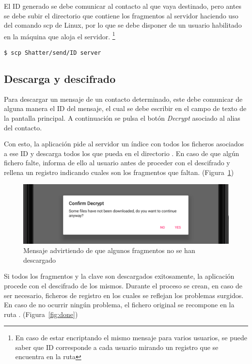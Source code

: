 El ID generado se debe comunicar al contacto al que vaya destinado, pero antes se debe subir el directorio que contiene los fragmentos al servidor haciendo uso del comando scp de Linux, por lo que se debe disponer de un usuario habilitado en la máquina que aloja el servidor. \footnote{En caso de estar encriptando el mismo mensaje para varios usuarios, se puede saber que ID corresponde a cada usuario mirando un registro que se encuentra en la ruta }

\lstset{basicstyle=\ttfamily}
\begin{lstlisting}[language=bash]
  $ scp Shatter/send/ID server
\end{lstlisting}

\subsection{Descarga y descifrado}

Para descargar un mensaje de un contacto determinado, este debe comunicar de alguna manera el ID del mensaje, el cual se debe escribir en el campo de texto de la pantalla principal. A continuación se pulsa el botón \emph{Decrypt} asociado al alias del contacto.

Con esto, la aplicación pide al servidor un índice con todos los ficheros asociados a ese ID y descarga todos los que pueda en el directorio . En caso de que algún fichero falte, informa de ello al usuario antes de proceder con el descifrado y rellena un registro indicando cuales son los fragmentos que faltan. (Figura~\ref{fig:miss})

\begin{figure}[!htb]
  \centering
  \includegraphics[scale=0.4]{Figures/miss}
  \decoRule
  \caption[Shatter (Faltan fragmentos)]{Mensaje advirtiendo de que algunos fragmentos no se han descargado}
  \label{fig:miss}
\end{figure}

Si todos los fragmentos y la clave son descargados exitosamente, la aplicación procede con el descifrado de los mismos. Durante el proceso se crean, en caso de ser necesario, ficheros de registro en los cuales se reflejan los problemas surgidos. En caso de no ocurrir ningún problema, el fichero original se recompone en la ruta . (Figura~\ref{fig:done})


